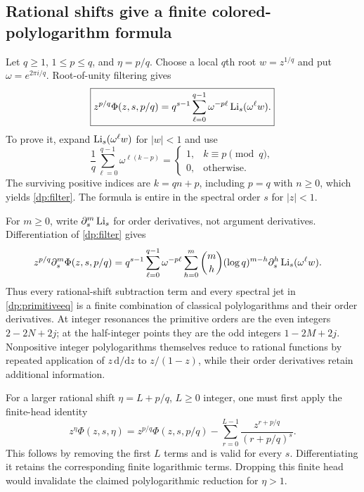 \subsection{Rational shifts give a finite colored-polylogarithm formula}
Let $q\ge1$, $1\le p\le q$, and $\eta=p/q$. Choose a local $q$th
root $w=z^{1/q}$ and put $\omega=e^{2\pi i/q}$. Root-of-unity
filtering gives
\begin{equation}\label{dp:filter}
 \boxed{z^{p/q}\Phi(z,s,p/q)
       =q^{s-1}\sum_{\ell=0}^{q-1}
                     \omega^{-p\ell}\operatorname{Li}_s(\omega^\ell w).}
\end{equation}
To prove it, expand $\operatorname{Li}_s(\omega^\ell w)$ for $|w|<1$ and use
\[
 \frac1q\sum_{\ell=0}^{q-1}\omega^{\ell(k-p)}
 =\begin{cases}1,&k\equiv p\pmod q,\\0,&\text{otherwise}.
   \end{cases}
\]
The surviving positive indices are $k=qn+p$, including $p=q$ with
$n\ge0$, which yields \eqref{dp:filter}. The formula is entire in
the spectral order $s$ for $|z|<1$.

For $m\ge0$, write $\partial_s^m\operatorname{Li}_s$ for order derivatives, not
argument derivatives. Differentiation of \eqref{dp:filter} gives
\begin{align}
 z^{p/q}\partial_s^m\Phi(z,s,p/q)
 ={}&q^{s-1}\sum_{\ell=0}^{q-1}\omega^{-p\ell}
 \sum_{h=0}^m\binom mh(\log q)^{m-h}
              \partial_s^h\operatorname{Li}_s(\omega^\ell w).
 \label{dp:filterjets}
\end{align}
Thus every rational-shift subtraction term and every spectral jet
in \eqref{dp:primitiveeq} is a finite combination of classical
polylogarithms and their order derivatives. At integer resonances the
primitive orders are the even integers $2-2N+2j$; at the half-integer
points they are the odd integers $1-2M+2j$. Nonpositive integer
polylogarithms themselves reduce to rational functions by repeated
application of $z\,\mathrm d/\mathrm dz$ to $z/(1-z)$, while their
order derivatives retain additional information.

For a larger rational shift $\eta=L+p/q$, $L\ge0$ integer,
one must first apply the finite-head identity
\begin{equation}\label{dp:shift}
 z^\eta\Phi(z,s,\eta)
 =z^{p/q}\Phi(z,s,p/q)
       -\sum_{r=0}^{L-1}\frac{z^{r+p/q}}{(r+p/q)^s}.
\end{equation}
This follows by removing the first $L$ terms and is valid for every
$s$. Differentiating it retains the corresponding finite logarithmic
terms. Dropping this finite head would invalidate the claimed
polylogarithmic reduction for $\eta>1$.

